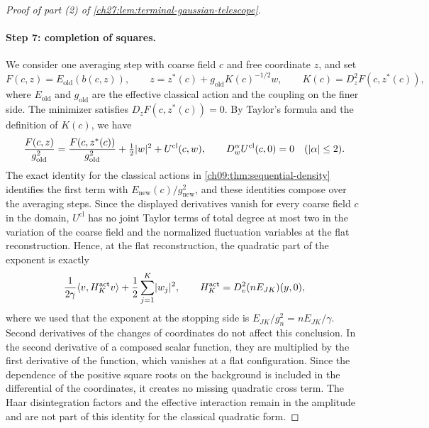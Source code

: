 \begin{proof}[Proof of part (2) of \cref{ch27:lem:terminal-gaussian-telescope}]
\paragraph{Step 7: completion of squares.}
We consider one averaging step with coarse field $c$ and free coordinate $z$, and set
\[
 F(c,z)=E_{\mathrm{old}}(b(c,z)),\qquad z=z^*(c)+g_{\mathrm{old}}K(c)^{-1/2}w,\qquad K(c)=D_z^2F(c,z^*(c)),
\]
where $E_{\mathrm{old}}$ and $g_{\mathrm{old}}$ are the effective classical action and the coupling on the finer side. The minimizer satisfies $D_zF(c,z^*(c))=0$. By Taylor's formula and the definition of $K(c)$, we have
\[
 \frac{F(c,z)}{g_{\mathrm{old}}^2}=\frac{F(c,z^*(c))}{g_{\mathrm{old}}^2}+\tfrac12\lvert w\rvert^2+U^{\mathrm{cl}}(c,w),\qquad D_w^\alpha U^{\mathrm{cl}}(c,0)=0\quad(\lvert \alpha\rvert\le2).
\]
The exact identity for the classical actions in \cref{ch09:thm:sequential-density} identifies the first term with $E_{\mathrm{new}}(c)/g_{\mathrm{new}}^2$, and these identities compose over the averaging steps. Since the displayed derivatives vanish for every coarse field $c$ in the domain, $U^{\mathrm{cl}}$ has no joint Taylor terms of total degree at most two in the variation of the coarse field and the normalized fluctuation variables at the flat reconstruction. Hence, at the flat reconstruction, the quadratic part of the exponent is exactly
\begin{equation}\label{ch27:eq:quadratic-telescope}
 \frac1{2\gamma}\langle v,H_K^{\mathrm{act}}v\rangle+\frac12\sum_{j=1}^K\lvert w_j\rvert^2,\qquad H_K^{\mathrm{act}}=D_v^2(nE_{JK})(y,0),
\end{equation}
where we used that the exponent at the stopping side is $E_{JK}/g_n^2=nE_{JK}/\gamma$. Second derivatives of the changes of coordinates do not affect this conclusion. In the second derivative of a composed scalar function, they are multiplied by the first derivative of the function, which vanishes at a flat configuration. Since the dependence of the positive square roots on the background is included in the differential of the coordinates, it creates no missing quadratic cross term. The Haar disintegration factors and the effective interaction remain in the amplitude and are not part of this identity for the classical quadratic form.


\end{proof}
